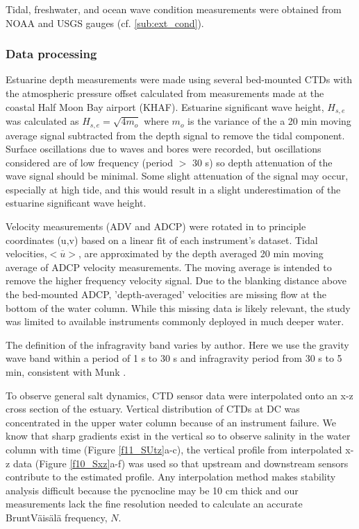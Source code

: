 Tidal, freshwater, and ocean wave condition measurements were obtained
from NOAA and USGS gauges (cf. \ref{sub:ext_cond}).


\subsubsection{Data processing\label{sub:Data-processing}}

Estuarine depth measurements were made using several bed-mounted CTDs
with the atmospheric pressure offset calculated from measurements
made at the coastal Half Moon Bay airport (KHAF). Estuarine significant
wave height, $H_{s,e}$ was calculated as $H_{s,e}=\sqrt{4m_{o}}$
where $m_{o}$ is the variance of the a 20 min moving average signal
subtracted from the depth signal to remove the tidal component. Surface
oscillations due to waves and bores were recorded, but oscillations
considered are of low frequency (period $>$ 30 s) so depth attenuation
of the wave signal should be minimal. Some slight attenuation of the
signal may occur, especially at high tide, and this would result in
a slight underestimation of the estuarine significant wave height.

Velocity measurements (ADV and ADCP) were rotated in to principle
coordinates (u,v) based on a linear fit of each instrument's dataset.
Tidal velocities,$\overline{<u>}$, are approximated by the depth
averaged 20 min moving average of ADCP velocity measurements. The
moving average is intended to remove the higher frequency velocity
signal. Due to the blanking distance above the bed-mounted ADCP, 'depth-averaged'
velocities are missing flow at the bottom of the water column. While
this missing data is likely relevant, the study was limited to available
instruments commonly deployed in much deeper water.

The definition of the infragravity band varies by author. Here we
use the gravity wave band within a period of 1 s to 30 s and infragravity
period from 30 s to 5 min, consistent with Munk \parencite*{munk_origin_1950}.

To observe general salt dynamics, CTD sensor data were interpolated
onto an x-z cross section of the estuary. Vertical distribution of
CTDs at DC was concentrated in the upper water column because of an
instrument failure. We know that sharp gradients exist in the vertical
so to observe salinity in the water column with time (Figure \ref{f11_SUtz}a-c),
the vertical profile from interpolated x-z data (Figure \ref{f10_Sxz}a-f)
was used so that upstream and downstream sensors contribute to the
estimated profile. Any interpolation method makes stability analysis
difficult because the pycnocline may be 10 cm thick and our measurements
lack the fine resolution needed to calculate an accurate Brunt\textendash V\"ais\"al\"a
frequency, $N$.


